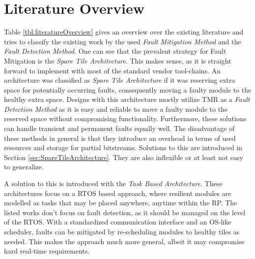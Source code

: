\section{Literature Overview}\label{sec:literatureOverview}
Table \ref{tbl:literatureOverview} gives an overview over the existing literature and tries to classify the existing work by the used \textit{Fault Mitigation Method} and the \textit{Fault Detection Method}.
One can see that the prevalent strategy for Fault Mitigation is the \textit{Spare Tile Architecture}. 
This makes sense, as it is straight forward to implement with most of the standard vendor tool-chains.
An architecture was classified as \textit{Spare Tile Architecture} if it was reserving extra space for potentially occurring faults, consequently moving a faulty module to the healthy extra space.
Designs with this architecture mostly utilize \gls{TMR} as a \textit{Fault Detection Method} as it is easy and reliable to move a faulty module to the reserved space without compromising functionality.
Furthermore, these solutions can handle transient and permanent faults equally well.
The disadvantage of these methods in general is that they introduce an overhead in terms of used resources and storage for partial bitstreams.
Solutions to this are introduced in Section \ref{sec:SpareTileArchitecture}. 
They are also inflexible or at least not easy to generalize.

A solution to this is introduced with the \textit{Task Based Architecture}.
These architectures focus on a \gls{RTOS} based approach, where resilient modules are modelled as tasks that may be placed anywhere, anytime within the \gls{RP}. 
The listed works don't focus on fault detection, as it should be managed on the level of the \gls{RTOS}.
With a standardized communication interface and an OS-like scheduler, faults can be mitigated by re-scheduling modules to healthy tiles as needed. 
This makes the approach much more general, albeit it may compromise hard real-time requirements.


